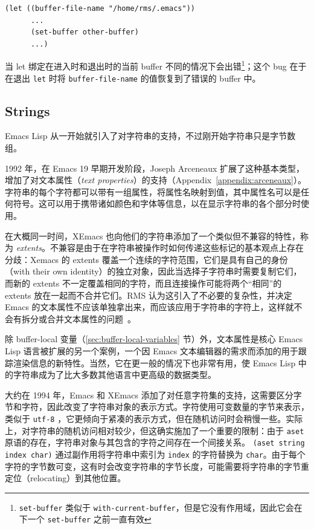 \documentclass[format=acmsmall,screen]{acmart}
\begin{document}
\begin{Verbatim}[samepage=true]
    (let ((buffer-file-name "/home/rms/.emacs"))
      ...
      (set-buffer other-buffer)
      ...)
\end{Verbatim}

当 let 绑定在进入时和退出时的当前 buffer 不同的情况下会出错\footnote{\texttt{set-buffer} 类似于 \texttt{with-current-buffer}，但是它没有作用域，因此它会在下一个 \texttt{set-buffer} 之前一直有效}；这个 bug 在于在退出 \texttt{let} 时将 \texttt{buffer-file-name} 的值恢复到了错误的 buffer 中。

\subsection{Strings}
\label{sec:strings}

Emacs Lisp 从一开始就引入了对字符串的支持，不过刚开始字符串只是字节数组。

1992 年，在 Emacs 19 早期开发阶段，Joseph Arceneaux 扩展了这种基本类型，增加了对文本属性（\emph{text properties}）的支持（Appendix~\ref{appendix:arceneaux}）。字符串的每个字符都可以带有一组属性，将属性名映射到值，其中属性名可以是任何符号。这可以用于携带诸如颜色和字体等信息，以在显示字符串的各个部分时使用。

在大概同一时间，XEmacs 也向他们的字符串添加了一个类似但不兼容的特性，称为 \emph{extents}。不兼容是由于在字符串被操作时如何传递这些标记的基本观点上存在分歧：Xemacs 的 extents 覆盖一个连续的字符范围，它们是具有自己的身份（with their own identity）的独立对象，因此当选择子字符串时需要复制它们，而新的 extents 不一定覆盖相同的字符，而且连接操作可能将两个“相同”的 extents 放在一起而不合并它们。RMS 认为这引入了不必要的复杂性，并决定 Emacs 的文本属性不应该单独拿出来，而应该应用于字符串的字符上，这样就不会有拆分或合并文本属性的问题~\cite{RMS-text-props}。

除 buffer-local 变量（\ref{sec:buffer-local-variables} 节）外，文本属性是核心 Emacs Lisp 语言被扩展的另一个案例，一个因 Emacs 文本编辑器的需求而添加的用于跟踪渲染信息的新特性。当然，它在更一般的情况下也非常有用，使 Emacs Lisp 中的字符串成为了比大多数其他语言中更高级的数据类型。

大约在 1994 年，Emacs 和 XEmacs 添加了对任意字符集的支持，这需要区分字节和字符，因此改变了字符串对象的表示方式。字符使用可变数量的字节来表示，类似于 \texttt{utf-8} ，它更倾向于紧凑的表示方式，但在随机访问时会稍慢一些。实际上，对字符串的随机访问相对较少，但这确实施加了一个重要的限制：由于 \texttt{aset} 原语的存在，字符串对象与其包含的字符之间存在一个间接关系。 \texttt{(aset string index char)} 通过副作用将字符串中索引为 \texttt{index} 的字符替换为 \texttt{char}。由于每个字符的字节数可变，这有时会改变字符串的字节长度，可能需要将字符串的字节重定位（relocating）到其他位置。
\end{document}
